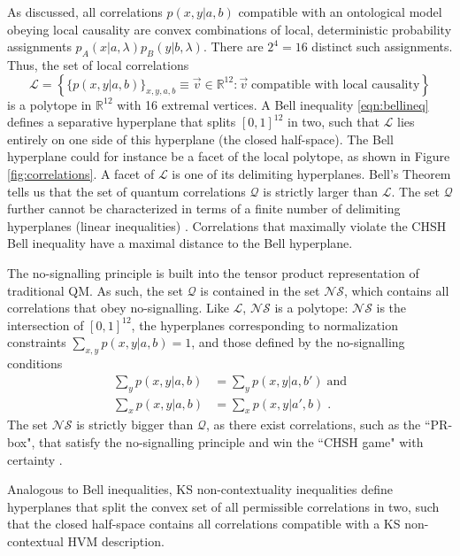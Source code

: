 As discussed, all correlations $p(x,y\vert a,b)$ compatible with an ontological model obeying local causality are convex combinations of local, deterministic probability assignments $p_A(x \vert a,\lambda)p_B(y \vert b,\lambda)$. There are $2^4=16$ distinct such assignments. Thus, the set of local correlations 
\begin{equation*}
\mathcal{L} =\left\lbrace\{p(x,y\vert a,b)\}_{x,y,a,b}\equiv \vec{v}\in\mathbb{R}^{12}: \vec{v}\; \text{compatible with local causality} \right\rbrace
\end{equation*}
is a polytope in $\mathbb{R}^{12}$ with 16 extremal vertices. A Bell inequality \ref{eqn:bellineq} defines a separative hyperplane that splits $[0,1]^{12}$ in two, such that $\mathcal{L}$ lies entirely on one side of this hyperplane (the closed half-space). The Bell hyperplane could for instance be a facet of the local polytope, as shown in Figure \ref{fig:correlations}. A facet of $\mathcal{L}$ is one of its delimiting hyperplanes. Bell's Theorem tells us that the set of quantum correlations $\mathcal{Q}$ is strictly larger than $\mathcal{L}$. The set $\mathcal{Q}$ further cannot be characterized in terms of a finite number of delimiting hyperplanes (linear inequalities) \cite{Brunner2014}. Correlations that maximally violate the CHSH Bell inequality have a maximal distance to the Bell hyperplane.

The no-signalling principle is built into the tensor product representation of traditional QM. As such, the set $\mathcal{Q}$ is contained in the set $\mathcal{NS}$, which contains all correlations that obey no-signalling. Like $\mathcal{L}$, $\mathcal{NS}$ is a polytope: $\mathcal{NS}$ is the intersection of $[0,1]^{12}$, the hyperplanes corresponding to normalization constraints $\sum_{x,y} p(x,y\vert a,b)=1$, and those defined by the no-signalling conditions
\begin{align*}
\sum_y p(x,y\vert a,b) & = \sum_y p(x,y\vert a,b') \; \text{and} \\
\sum_x p(x,y\vert a,b) & = \sum_x p(x,y\vert a',b)\;.
\end{align*}
The set $\mathcal{NS}$ is strictly bigger than $\mathcal{Q}$, as there exist correlations, such as the ``PR-box", that satisfy the no-signalling principle and win the ``CHSH game" with certainty \cite{Brunner2014}.

Analogous to Bell inequalities, KS non-contextuality inequalities define hyperplanes that split the convex set of all permissible correlations in two, such that the closed half-space contains all correlations compatible with a KS non-contextual HVM description.

